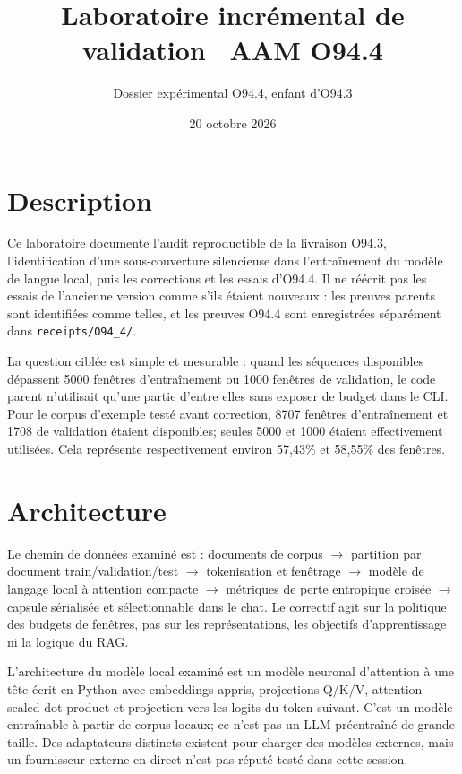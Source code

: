 \documentclass[11pt,a4paper]{article}
\title{Laboratoire incrémental de validation \ AAM O94.4}
\author{Dossier expérimental O94.4, enfant d'O94.3}
\date{20 octobre 2026}
\begin{document}
\maketitle
\tableofcontents
\section{Description}
Ce laboratoire documente l'audit reproductible de la livraison O94.3, l'identification d'une sous-couverture silencieuse dans l'entraînement du modèle de langue local, puis les corrections et les essais d'O94.4. Il ne réécrit pas les essais de l'ancienne version comme s'ils étaient nouveaux : les preuves parents sont identifiées comme telles, et les preuves O94.4 sont enregistrées séparément dans \texttt{receipts/O94\_4/}.

La question ciblée est simple et mesurable : quand les séquences disponibles dépassent 5000 fenêtres d'entraînement ou 1000 fenêtres de validation, le code parent n'utilisait qu'une partie d'entre elles sans exposer de budget dans le CLI. Pour le corpus d'exemple testé avant correction, 8707 fenêtres d'entraînement et 1708 de validation étaient disponibles; seules 5000 et 1000 étaient effectivement utilisées. Cela représente respectivement environ 57,43\% et 58,55\% des fenêtres.

\section{Architecture}
Le chemin de données examiné est : documents de corpus $\rightarrow$ partition par document train/validation/test $\rightarrow$ tokenisation et fenêtrage $\rightarrow$ modèle de langage local à attention compacte $\rightarrow$ métriques de perte entropique croisée $\rightarrow$ capsule sérialisée et sélectionnable dans le chat. Le correctif agit sur la politique des budgets de fenêtres, pas sur les représentations, les objectifs d'apprentissage ni la logique du RAG.

L'architecture du modèle local examiné est un modèle neuronal d'attention à une tête écrit en Python avec embeddings appris, projections Q/K/V, attention scaled-dot-product et projection vers les logits du token suivant. C'est un modèle entraînable à partir de corpus locaux; ce n'est pas un LLM préentraîné de grande taille. Des adaptateurs distincts existent pour charger des modèles externes, mais un fournisseur externe en direct n'est pas réputé testé dans cette session.
\end{document}
